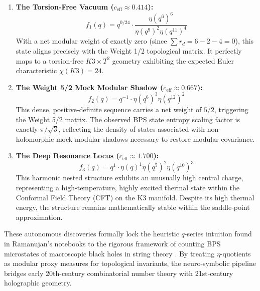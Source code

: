 \begin{enumerate}
    \item \textbf{The Torsion-Free Vacuum ($c_{\text{eff}} \approx 0.414$):}
    \begin{equation}
    f_1(q) = q^{0/24} \cdot \frac{\eta(q^6)^6}{\eta(q^9)^2 \eta(q^{11})^4}
    \end{equation}
    With a net modular weight of exactly zero (since $\sum r_d = 6 - 2 - 4 = 0$), this state aligns precisely with the Weight 1/2 topological matrix. It perfectly maps to a torsion-free $K3 \times T^2$ geometry exhibiting the expected Euler characteristic $\chi(K3) = 24$.

    \item \textbf{The Weight 5/2 Mock Modular Shadow ($c_{\text{eff}} \approx 0.667$):}
    \begin{equation}
    f_2(q) = q^{-1} \cdot \eta(q^6)^3 \eta(q^{12})^2
    \end{equation}
    This dense, positive-definite sequence carries a net weight of $5/2$, triggering the Weight 5/2 matrix. The observed BPS state entropy scaling factor is exactly $\pi/\sqrt{3}$, reflecting the density of states associated with non-holomorphic mock modular shadows \cite{Zwegers2002} necessary to restore modular covariance.

    \item \textbf{The Deep Resonance Locus ($c_{\text{eff}} \approx 1.700$):}
    \begin{equation}
    f_3(q) = q^1 \cdot \eta(q)^1 \eta(q^5)^2 \eta(q^{10})^3
    \end{equation}
    This harmonic nested structure exhibits an unusually high central charge, representing a high-temperature, highly excited thermal state within the Conformal Field Theory (CFT) on the K3 manifold. Despite its high thermal energy, the structure remains mathematically stable within the saddle-point approximation.
\end{enumerate}

These autonomous discoveries formally lock the heuristic $q$-series intuition found in Ramanujan's notebooks to the rigorous framework of counting BPS microstates of macroscopic black holes in string theory \cite{GPPV2020}. By treating $\eta$-quotients as modular proxy measures for topological invariants, the neuro-symbolic pipeline bridges early 20th-century combinatorial number theory with 21st-century holographic geometry.
